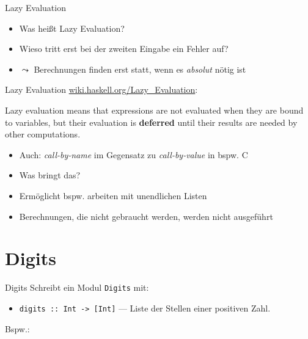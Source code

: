 \documentclass{beamer}
\begin{document}
\begin{frame}{Lazy Evaluation}

	\begin{itemize}
		\item Was heißt Lazy Evaluation?
		\item Wieso tritt erst bei der zweiten Eingabe ein Fehler auf?
		\pause
		\item $\leadsto$ Berechnungen finden erst statt, wenn es \emph{absolut} nötig ist
	\end{itemize}
\end{frame}

\begin{frame}{Lazy Evaluation}
      \href{https://wiki.haskell.org/Lazy\_evaluation}{wiki.haskell.org/Lazy\_Evaluation}:

	\begin{displayquote}
		Lazy evaluation means that expressions are not evaluated when they are bound to variables, but their evaluation is \textbf{deferred} until their results are needed by other computations.
	\end{displayquote}

	\begin{itemize}
		\item Auch: \emph{call-by-name} im Gegensatz zu \emph{call-by-value} in bspw. C
		\item Was bringt das?
		\pause
		\item Ermöglicht bspw. arbeiten mit unendlichen Listen
		\item Berechnungen, die nicht gebraucht werden, werden nicht ausgeführt
	\end{itemize}
\end{frame}

\section{Digits}

\begin{frame}{Digits}
  Schreibt ein Modul \texttt{Digits} mit:

  \begin{itemize}
    \item \texttt{digits :: Int -> [Int]} --- Liste der Stellen einer positiven Zahl.
  \end{itemize}

  Bspw.:

\end{frame}
\end{document}
